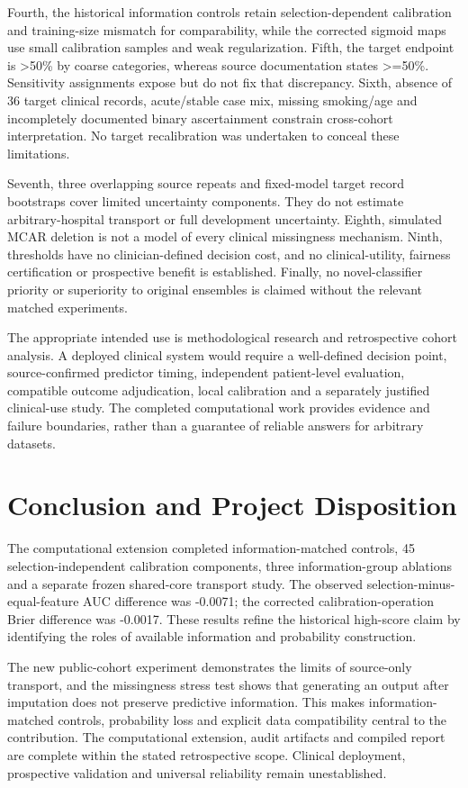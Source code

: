 \documentclass[conference]{IEEEtran}
\begin{document}
Fourth, the historical information controls retain selection-dependent calibration and training-size mismatch for comparability, while the corrected sigmoid maps use small calibration samples and weak regularization. Fifth, the target endpoint is >50\% by coarse categories, whereas source documentation states >=50\%. Sensitivity assignments expose but do not fix that discrepancy. Sixth, absence of 36 target clinical records, acute/stable case mix, missing smoking/age and incompletely documented binary ascertainment constrain cross-cohort interpretation. No target recalibration was undertaken to conceal these limitations.

Seventh, three overlapping source repeats and fixed-model target record bootstraps cover limited uncertainty components. They do not estimate arbitrary-hospital transport or full development uncertainty. Eighth, simulated MCAR deletion is not a model of every clinical missingness mechanism. Ninth, thresholds have no clinician-defined decision cost, and no clinical-utility, fairness certification or prospective benefit is established. Finally, no novel-classifier priority or superiority to original ensembles is claimed without the relevant matched experiments.

The appropriate intended use is methodological research and retrospective cohort analysis. A deployed clinical system would require a well-defined decision point, source-confirmed predictor timing, independent patient-level evaluation, compatible outcome adjudication, local calibration and a separately justified clinical-use study. The completed computational work provides evidence and failure boundaries, rather than a guarantee of reliable answers for arbitrary datasets.

\section{Conclusion and Project Disposition}
The computational extension completed information-matched controls, 45 selection-independent calibration components, three information-group ablations and a separate frozen shared-core transport study. The observed selection-minus-equal-feature AUC difference was -0.0071; the corrected calibration-operation Brier difference was -0.0017. These results refine the historical high-score claim by identifying the roles of available information and probability construction.

The new public-cohort experiment demonstrates the limits of source-only transport, and the missingness stress test shows that generating an output after imputation does not preserve predictive information. This makes information-matched controls, probability loss and explicit data compatibility central to the contribution. The computational extension, audit artifacts and compiled report are complete within the stated retrospective scope. Clinical deployment, prospective validation and universal reliability remain unestablished.
\end{document}
